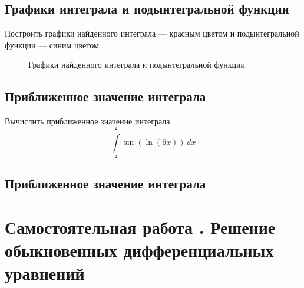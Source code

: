 \documentclass[10pt, a4paper, titlepage]{article}
\begin{document}
\subsection*{Графики интеграла и подынтегральной функции}

Построить графики найденного интеграла --- красным цветом и подынтегральной функции --- синим цветом.

\begin{figure}[H]
    \centering
    \caption{Графики найденного интеграла и подынтегральной функции}
\end{figure}


\subsection*{Приближенное значение интеграла}

Вычислить приближенное значение интеграла: $$\int\limits_2^{8} \sin(\ln(6x))\,dx$$

\subsection*{Приближенное значение интеграла}

\section{Самостоятельная работа . Решение обыкновенных дифференциальных уравнений}
\end{document}
